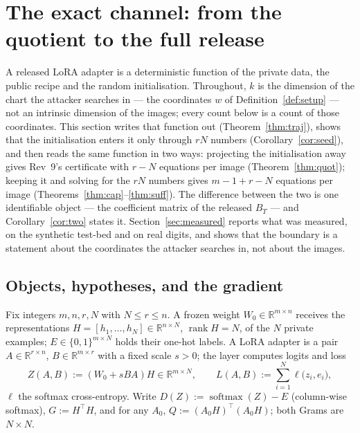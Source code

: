 \section{The exact channel: from the quotient to the full release}
\label{sec:exact-channel}

A released LoRA adapter is a deterministic function of the private data, the
public recipe and the random initialisation. Throughout, $k$ is the
dimension of the chart the attacker searches in — the coordinates $w$ of
Definition~\ref{def:setup} — not an intrinsic dimension of the images; every
count below is a count of those coordinates. This section writes that
function out (Theorem~\ref{thm:traj}), shows that the initialisation enters
it only through $rN$ numbers (Corollary~\ref{cor:seed}), and then reads the
same function in two ways: projecting the initialisation away gives Rev~9's
certificate with $r-N$ equations per image (Theorem~\ref{thm:quot}); keeping
it and solving for the $rN$ numbers gives $m-1+r-N$ equations per image
(Theorems~\ref{thm:cap}--\ref{thm:suff}). The difference between the two is
one identifiable object — the coefficient matrix of the released $B_T$ —
and Corollary~\ref{cor:two} states it. Section~\ref{sec:measured} reports
what was measured, on the synthetic test-bed and on real digits, and shows
that the boundary is a statement about the coordinates the attacker searches
in, not about the images.

\subsection{Objects, hypotheses, and the gradient}
\label{sec:objects}

\begin{definition}\label{def:setup}
Fix integers $m,n,r,N$ with $N\le r\le n$. A frozen weight
$W_0\in\mathbb R^{m\times n}$ receives the representations
$H=[h_1,\dots,h_N]\in\mathbb R^{n\times N}$, $\operatorname{rank}H=N$, of the $N$ private examples;
$E\in\{0,1\}^{m\times N}$ holds their one-hot labels. A LoRA adapter is a
pair $A\in\mathbb R^{r\times n}$, $B\in\mathbb R^{m\times r}$ with a fixed
scale $s>0$; the layer computes logits and loss
\[
  Z(A,B):=(W_0+sBA)H\in\mathbb R^{m\times N},\qquad
  L(A,B):=\sum_{i=1}^N \ell\bigl(z_i,e_i\bigr),
\]
$\ell$ the softmax cross-entropy. Write $D(Z):=\operatorname{softmax}(Z)-E$
(column-wise softmax), $G:=H^{\!\top}H$, and for any $A_0$,
$Q:=(A_0H)^{\!\top}(A_0H)$; both Grams are $N\times N$.
\end{definition}

